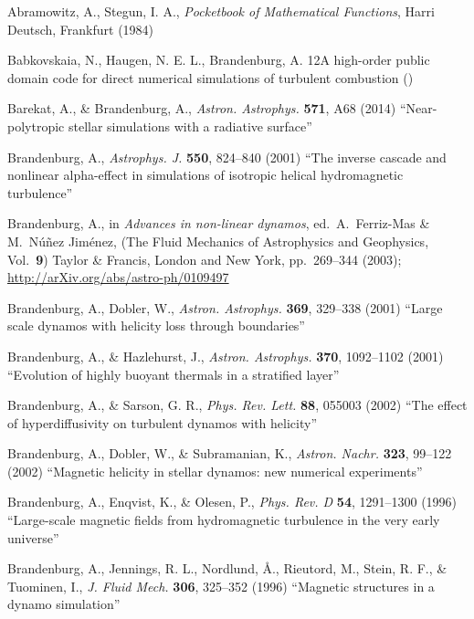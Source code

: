 \documentclass[\mydriver,12pt,twoside,notitlepage,a4paper]{article}
\begin{document}

\begin{thebibliography}{99}

 Abramowitz, A., Stegun, I. A.,
  \emph{Pocketbook of Mathematical Functions\/},
  Harri Deutsch, Frankfurt (1984)

 Babkovskaia, N., Haugen, N. E. L., Brandenburg, A.
{12}{A high-order public domain code for direct numerical simulations of turbulent combustion}
()

 Barekat, A., \& Brandenburg, A.,
  \emph{Astron. Astrophys.} \textbf{571}, A68 (2014)
  ``Near-polytropic stellar simulations with a radiative surface''

 Brandenburg, A.,
  \emph{Astrophys. J.} \textbf{550}, 824--840 (2001)
  ``The inverse cascade and nonlinear alpha-effect in simulations
  of isotropic helical hydromagnetic turbulence''

 Brandenburg, A., in \emph{Advances in non-linear dynamos},
  ed.\ A.\ Ferriz-Mas \& M.\ N\'u\~nez Jim\'enez,
  (The Fluid Mechanics of Astrophysics and Geophysics, Vol.\ {\bf9})
  Taylor \& Francis, London and New York, pp.~269--344 (2003);
  \url{http://arXiv.org/abs/astro-ph/0109497}

 Brandenburg, A., Dobler, W.,
  \emph{Astron. Astrophys.} \textbf{369}, 329--338 (2001)
  ``Large scale dynamos with helicity loss through boundaries''

 Brandenburg, A., \& Hazlehurst, J.,
  \emph{Astron. Astrophys.} \textbf{370}, 1092--1102 (2001)
  ``Evolution of highly buoyant thermals in a stratified layer''

 Brandenburg, A., \& Sarson, G. R.,
  \emph{Phys. Rev. Lett.} \textbf{88}, 055003 (2002)
  ``The effect of hyperdiffusivity on turbulent dynamos with helicity''

Brandenburg, A., Dobler, W., \& Subramanian, K.,
  \emph{Astron. Nachr.} \textbf{323}, 99--122 (2002)
  ``Magnetic helicity in stellar dynamos: new numerical experiments''

Brandenburg, A., Enqvist, K., \& Olesen, P.,
  \emph{Phys. Rev. D} \textbf{54}, 1291--1300 (1996)
  ``Large-scale magnetic fields from hydromagnetic turbulence
in the very early universe''

 Brandenburg, A., Jennings, R. L., Nordlund, \AA.,
  Rieutord, M., Stein, R. F., \& Tuominen, I.,
  \emph{J. Fluid Mech.} \textbf{306}, 325--352 (1996)
  ``Magnetic structures in a dynamo simulation''


\end{thebibliography}
\end{document}
